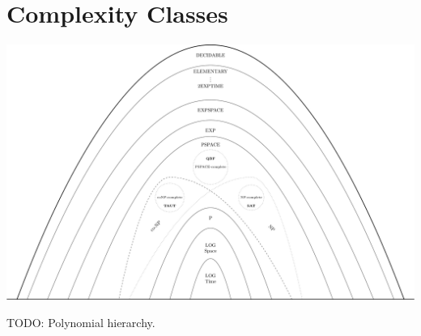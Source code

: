 \documentclass[10pt,a4paper]{article}
\begin{document}

\section{Complexity Classes}

\begin{center}
    \includegraphics[scale=0.11]{diagrams/complexity-classes.png} 
\end{center}

TODO: Polynomial hierarchy.



\end{document}
